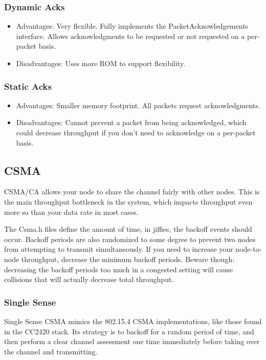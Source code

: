 \documentclass{article}
\begin{document}
\subsubsection{Dynamic Acks}
\begin{itemize}
  \item Advantages: Very flexible. Fully implements the PacketAcknowledgements interface. 
  Allows acknowledgments to be requested or not requested on a per-packet basis.
  \item Disadvantages: Uses more ROM to support flexibility.
\end{itemize}

\subsubsection{Static Acks}
\begin{itemize}
  \item Advantages: Smaller memory footprint. All packets request acknowledgments.
  \item Disadvantages: Cannot prevent a packet from being acknowledged, which could 
  decrease throughput if you don't need to acknowledge on a per-packet basis.
\end{itemize}

\subsection{CSMA}
\label{sec:csma}
CSMA/CA allows your node to share the channel fairly with other nodes.
This is the main throughput bottleneck in the system, which impacts
throughput even more so than your data rate in most cases. 

The Csma.h files define the amount of time, in jiffies, the backoff
events should occur.  Backoff periods are also randomized to some
degree to prevent two nodes from attempting to transmit simultaneously.
If you need to increase your node-to-node throughput, decrease the minimum backoff periods. Beware though: decreasing the backoff periods
too much in a congested setting will cause collisions that will actually
decrease total throughput. 

\subsubsection{Single Sense}
\label{sec:singlesense}
Single Sense CSMA mimics the 802.15.4 CSMA implementations, like those
found in the CC2420 stack.  Its strategy is to backoff for a random
period of time, and then perform a clear channel assessment one time immediately before taking over the channel and transmitting.
\end{document}

